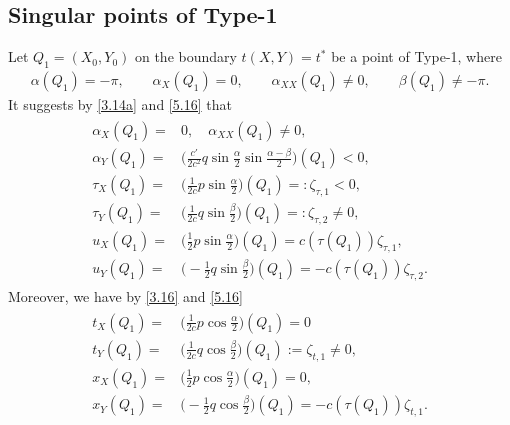 \documentclass[11pt,reqno]{article}
\newcommand{\fr}{\frac}
\numberwithin{equation}{section}
\begin{document}
\subsection{Singular points of Type-1}\label{S51}

Let $Q_1=(X_0,Y_0)$ on the boundary $t(X,Y)=t^*$ be a point of Type-1, where
\begin{align}\label{5.16}
\alpha(Q_1)=-\pi,\qquad \alpha_X(Q_1)=0, \qquad \alpha_{XX}(Q_1)\neq0,\qquad  \beta(Q_1)\neq-\pi.
\end{align}
It suggests by \eqref{3.14a} and \eqref{5.16} that
\begin{align}\label{5.17}
\begin{split}
\alpha_X(Q_1)=& 0,\quad \alpha_{XX}(Q_1)\neq0, \\[4pt]
\alpha_Y(Q_1)=&\Big(\fr{c'}{2c^2}q\sin\fr{\alpha}{2}\sin\fr{\alpha-\beta}{2}\Big)(Q_1)<0, \\[4pt]
\tau_X(Q_1)=&\Big(\fr{1}{2c}p\sin\fr{\alpha}{2}\Big)(Q_1)=:\zeta_{\tau, 1}<0,\\[4pt]
\tau_Y(Q_1)=&\Big(\fr{1}{2c}q\sin\fr{\beta}{2}\Big)(Q_1)=:\zeta_{\tau, 2}\neq0, \\[4pt]
u_X(Q_1)=&\Big(\fr{1}{2}p\sin\fr{\alpha}{2}\Big)(Q_1)=c(\tau(Q_1))\zeta_{\tau, 1},\\[4pt]
u_Y(Q_1)=&\Big(-\fr{1}{2}q\sin\fr{\beta}{2}\Big)(Q_1)=-c(\tau(Q_1))\zeta_{\tau, 2}.
\end{split}
\end{align}
Moreover, we have by \eqref{3.16} and \eqref{5.16}
\begin{align}\label{5.18}
\begin{split}
t_X(Q_1)=& \Big(\fr{1}{2c}p\cos\fr{\alpha}{2}\Big)(Q_1)=0 \\[4pt]
t_Y(Q_1)=&\Big(\fr{1}{2c}q\cos\fr{\beta}{2}\Big)(Q_1):=\zeta_{t,1}\neq0, \\[4pt]
x_X(Q_1)=&\Big(\fr{1}{2}p\cos\fr{\alpha}{2}\Big)(Q_1)=0,\\[4pt]
x_Y(Q_1)=&\Big(-\fr{1}{2}q\cos\fr{\beta}{2}\Big)(Q_1)=-c(\tau(Q_1))\zeta_{t,1}.
\end{split}
\end{align}
\end{document}
